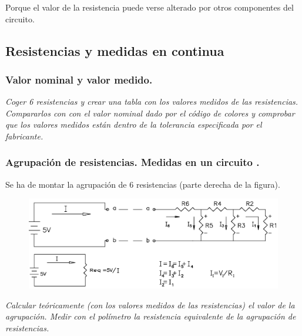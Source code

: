 \documentclass[paper=a4, fontsize=11pt]{scrartcl} %
\numberwithin{equation}{section} %
\numberwithin{figure}{section} %
\numberwithin{table}{section} %
\begin{document}
Porque el valor de la resistencia puede verse alterado por otros componentes del circuito. \newline

\subsection{Resistencias y medidas en continua}

\subsubsection{Valor nominal y valor medido.} 

\textit{Coger 6 resistencias y crear una tabla con los valores medidos de las resistencias. Compararlos con con el valor nominal dado por el código de colores y comprobar que los valores medidos están dentro de la tolerancia especificada por el fabricante.} \newline

\subsubsection{Agrupación de resistencias. Medidas en un circuito \cite{IA}.} 

Se ha de montar la agrupación de 6 resistencias (parte derecha de la figura).
\begin{figure}[h]
	\centering
	\includegraphics[scale=1]{image/agrupacion-resistencia}
\end{figure}

\textit{Calcular teóricamente (con los valores medidos de las resistencias) el valor de la agrupación. Medir con el polímetro la resistencia equivalente de la agrupación de resistencias.} \newline
\end{document}
